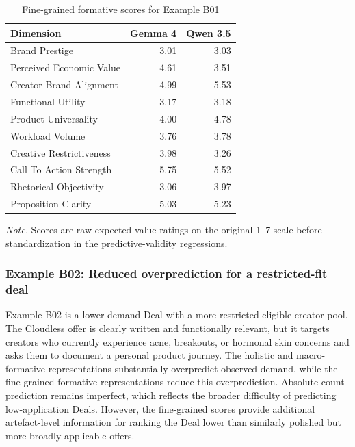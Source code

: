 \begin{table}[htbp]
\centering
\small
\caption{Fine-grained formative scores for Example B01}
\label{tab:barter_example_b01_scores}
\begin{tabular}{@{}lrr@{}}
\toprule
Dimension & Gemma 4 & Qwen 3.5 \\
\midrule
Brand Prestige & 3.01 & 3.03 \\
Perceived Economic Value & 4.61 & 3.51 \\
Creator Brand Alignment & 4.99 & 5.53 \\
Functional Utility & 3.17 & 3.18 \\
Product Universality & 4.00 & 4.78 \\
Workload Volume & 3.76 & 3.78 \\
Creative Restrictiveness & 3.98 & 3.26 \\
Call To Action Strength & 5.75 & 5.52 \\
Rhetorical Objectivity & 3.06 & 3.97 \\
Proposition Clarity & 5.03 & 5.23 \\
\bottomrule
\end{tabular}

\begin{flushleft}
\footnotesize
\textit{Note.} Scores are raw expected-value ratings on the original 1--7 scale before standardization in the predictive-validity regressions.
\end{flushleft}
\end{table}


\clearpage
\subsubsection*{Example B02: Reduced overprediction for a restricted-fit deal}

Example B02 is a lower-demand Deal with a more restricted eligible creator pool. The Cloudless offer is clearly written and functionally relevant, but it targets creators who currently experience acne, breakouts, or hormonal skin concerns and asks them to document a personal product journey. The holistic and macro-formative representations substantially overpredict observed demand, while the fine-grained formative representations reduce this overprediction. Absolute count prediction remains imperfect, which reflects the broader difficulty of predicting low-application Deals. However, the fine-grained scores provide additional artefact-level information for ranking the Deal lower than similarly polished but more broadly applicable offers.




